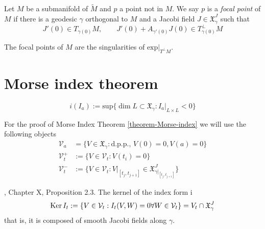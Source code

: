 \begin{definition}
\label{definition-focal-point}
Let $M$ be a submanifold of $\tilde{M}$ and $p$ a point not in $M$. We say $p$
is a {\it focal point} of $M$ if there is a geodesic $\gamma$ orthogonal to $M$
and a Jacobi field $J\in\mathfrak{X}^J_\gamma$ such that
$$
J'(0)\in T_{\gamma(0)}M,\qquad J'(0)+A_{\gamma'(0)}J(0)\in T_{\gamma(0)}^\perp M
$$
\end{definition}

\begin{proposition}
\label{proposition-focal-points-are-singularities-of-normal-exponential}
The focal points of $M$ are the singularities of $\text{exp}|_{T^\perp M}.$
\end{proposition}

\section{Morse index theorem}
\label{section-morse-index}

\begin{definition}
\label{definition-index-index-form}
$$
i(I_a):=\text{sup}\{\dim L \subset \mathfrak{X}_\gamma:I_a |_{L \times L}<0\}
$$
\end{definition}

For the proof of Morse Index Theorem \ref{theorem-Morse-index} we will use the
following objects
\begin{equation}
\label{equation-index-theorem-spaces}
\begin{aligned}
\mathcal{V}_a&=\{V \in \mathfrak{X}_\gamma:\text{d.p.p., }V(0)=0, V(a)=0\}\\
\mathcal{V}_t^+&:=\{V \in \mathcal{V}_t:V(t_i)=0\}\\
\mathcal{V}_t^-& :=\{V \in \mathcal{V}_t:V|_{[t_j,t_{j+1}]}\in
\mathfrak{X}_{\gamma|_{[t_j,t_{j+1}]}}^J\}
\end{aligned}
\end{equation}

\begin{proposition}
\label{proposition-kernel-of-index-form}
\cite{doc}, Chapter X, Proposition 2.3. The kernel of the index form i
$$
\mathop{\mathrm{Ker}} I_t:=\{V \in \mathcal{V}_t:I_t(V,W)=0\forall W\in\mathcal{V}_t\}=
V_t \cap \mathfrak{X}_\gamma^J 
$$
that is, it is composed of smooth Jacobi fields along $\gamma$.
\end{proposition}

